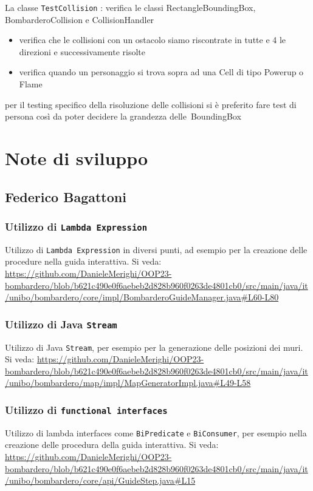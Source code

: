 \documentclass[a4paper,12pt]{report}
\begin{document}
\par
La classe \texttt{TestCollision} : verifica le classi RectangleBoundingBox, BombarderoCollision e CollisionHandler 
\begin{itemize}
    \item verifica che le collisioni con un ostacolo siamo riscontrate in tutte e 4 le direzioni e successivamente risolte  
    \item verifica quando un personaggio si trova sopra ad una Cell di tipo Powerup o Flame
\end{itemize}
\par
per il testing specifico della risoluzione delle collisioni si è preferito fare test di persona così da poter decidere la grandezza delle BoundingBox

\section{Note di sviluppo}

\subsection{Federico Bagattoni}
\subsubsection{Utilizzo di \texttt{Lambda Expression}}
Utilizzo di \texttt{Lambda Expression} in diversi punti, ad esempio per la creazione
delle procedure nella guida interattiva. Si veda: \url{https://github.com/DanieleMerighi/OOP23-bombardero/blob/b621c490e0f6aebeb2d828b960f0263de4801cb0/src/main/java/it/unibo/bombardero/core/impl/BombarderoGuideManager.java#L60-L80}

\subsubsection{Utilizzo di Java \texttt{Stream}}
Utilizzo di Java \texttt{Stream}, per esempio per la generazione delle posizioni dei muri. Si veda:
\url{https://github.com/DanieleMerighi/OOP23-bombardero/blob/b621c490e0f6aebeb2d828b960f0263de4801cb0/src/main/java/it/unibo/bombardero/map/impl/MapGeneratorImpl.java#L49-L58} 

\subsubsection{Utilizzo di \texttt{functional interfaces}}
Utilizzo di lambda interfaces come \texttt{BiPredicate} e \texttt{BiConsumer}, per esempio nella creazione delle procedura della guida interattiva. Si veda:
\url{https://github.com/DanieleMerighi/OOP23-bombardero/blob/b621c490e0f6aebeb2d828b960f0263de4801cb0/src/main/java/it/unibo/bombardero/core/api/GuideStep.java#L15}
\end{document}
